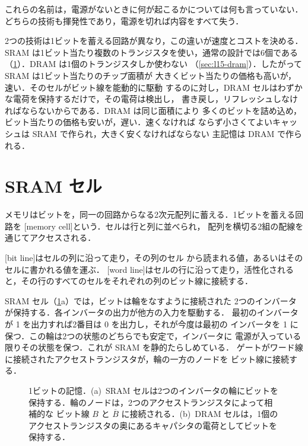 \documentclass[../main.tex]{subfiles}
\begin{document}
これらの名前は，電源がないときに何が起こるかについては何も言っていない．
どちらの技術も揮発性であり，電源を切れば内容をすべて失う．

2つの技術は1ビットを蓄える回路が異なり，この違いが速度とコストを決める．
SRAM は1ビット当たり複数のトランジスタを使い，通常の設計では6個である
（\cref{sec:l15-sram}）．DRAM は1個のトランジスタしか使わない
（\cref{sec:l15-dram}）．したがって SRAM は1ビット当たりのチップ面積が
大きくビット当たりの価格も高いが，速い．そのセルがビット線を能動的に駆動
するのに対し，DRAM セルはわずかな電荷を保持するだけで，その電荷は検出し，
書き戻し，リフレッシュしなければならないからである．DRAM は同じ面積により
多くのビットを詰め込め，ビット当たりの価格も安いが，遅い．速くなければ
ならず小さくてよいキャッシュは SRAM で作られ，大きく安くなければならない
主記憶は DRAM で作られる．

\section{SRAM セル}
\label{sec:l15-sram}

メモリはビットを，同一の回路からなる2次元配列に蓄える．1ビットを蓄える回路を
[memory cell]という．セルは行と列に並べられ，
配列を横切る2組の配線を通じてアクセスされる．

\begin{definition}[ビット線とワード線]
  [bit line]はセルの列に沿って走り，その列のセル
  から読まれる値，あるいはそのセルに書かれる値を運ぶ．
  [word line]はセルの行に沿って走り，活性化される
  と，その行のすべてのセルをそれぞれの列のビット線に接続する．
\end{definition}

SRAM セル（\cref{fig:l15-cells}a）では，ビットは輪をなすように接続された
2つのインバータが保持する．各インバータの出力が他方の入力を駆動する．
最初のインバータが 1 を出力すれば2番目は 0 を出力し，それが今度は最初の
インバータを 1 に保つ．この輪は2つの状態のどちらでも安定で，インバータに
電源が入っている限りその状態を保つ．これが SRAM を静的たらしめている．
ゲートがワード線に接続されたアクセストランジスタが，輪の一方のノードを
ビット線に接続する．

\begin{figure}[htbp]
  \centering
  
  \caption{1ビットの記憶．(a)~SRAM セルは2つのインバータの輪にビットを
    保持する．輪のノードは，2つのアクセストランジスタによって相補的な
    ビット線 $B$ と $\overline{B}$ に接続される．(b)~DRAM セルは，1個の
    アクセストランジスタの奥にあるキャパシタの電荷としてビットを保持する．}
  \label{fig:l15-cells}
\end{figure}
\end{document}
